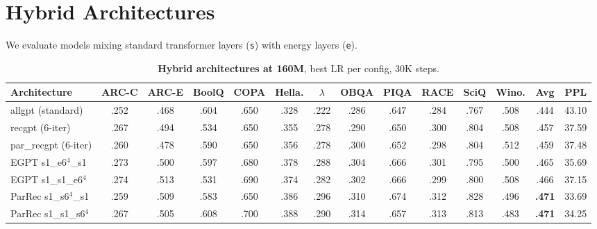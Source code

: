 \documentclass[oneside]{article}
\begin{document}
\section{Hybrid Architectures}
\label{sec:hybrid}

We evaluate models mixing standard transformer layers (\texttt{s}) with energy layers (\texttt{e}).

\begin{table}[t]
\centering
\caption{\textbf{Hybrid architectures at 160M}, best LR per config, 30K steps.}
\label{tab:hybrid_160m}
\begin{adjustbox}{max width=\textwidth}
\begin{tabular}{l|ccccccccccc|c|c}
\toprule
\textbf{Architecture} & \textbf{ARC-C} & \textbf{ARC-E} & \textbf{BoolQ} & \textbf{COPA} & \textbf{Hella.} & \textbf{$\lambda$} & \textbf{OBQA} & \textbf{PIQA} & \textbf{RACE} & \textbf{SciQ} & \textbf{Wino.} & \textbf{Avg} & \textbf{PPL} \\
\midrule
allgpt (standard)        & .252 & .468 & .604 & .650 & .328 & .222 & .286 & .647 & .284 & .767 & .508 & .444 & 43.10 \\
recgpt (6-iter)          & .267 & .494 & .534 & .650 & .355 & .278 & .290 & .650 & .300 & .804 & .508 & .457 & 37.59 \\
par\_recgpt (6-iter)      & .260 & .478 & .590 & .650 & .356 & .278 & .300 & .652 & .298 & .804 & .512 & .459 & 37.48 \\
\midrule
EGPT s1\_e6$^4$\_s1      & .273 & .500 & .597 & .680 & .378 & .288 & .304 & .666 & .301 & .795 & .500 & .465 & 35.69 \\
EGPT s1\_s1\_e6$^4$      & .274 & .513 & .531 & .690 & .374 & .282 & .302 & .666 & .299 & .800 & .508 & .466 & 37.15 \\
ParRec s1\_s6$^4$\_s1    & .259 & .509 & .583 & .650 & .386 & .296 & .310 & .674 & .312 & .828 & .496 & \textbf{.471} & 33.69 \\
ParRec s1\_s1\_s6$^4$    & .267 & .505 & .608 & .700 & .388 & .290 & .314 & .657 & .313 & .813 & .483 & \textbf{.471} & 34.25 \\
\bottomrule
\end{tabular}
\end{adjustbox}
\end{table}
\end{document}
